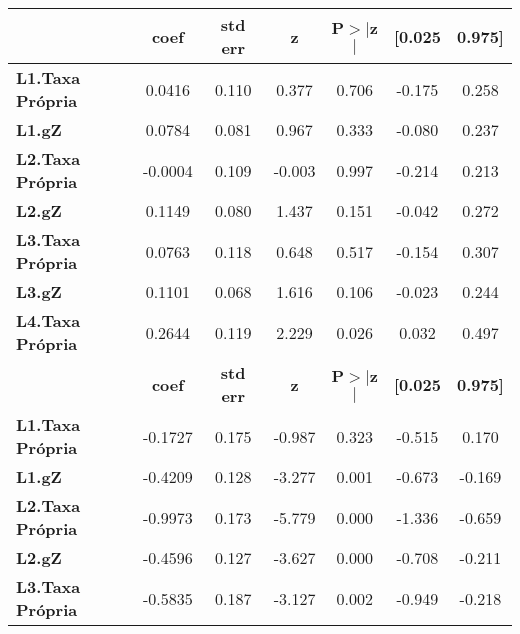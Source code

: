 \begin{center}
\begin{tabular}{lcccccc}
\toprule
                         & \textbf{coef} & \textbf{std err} & \textbf{z} & \textbf{P$> |$z$|$} & \textbf{[0.025} & \textbf{0.975]}  \\
\midrule
\textbf{L1.Taxa Própria} &       0.0416  &        0.110     &     0.377  &         0.706        &       -0.175    &        0.258     \\
\textbf{L1.gZ}           &       0.0784  &        0.081     &     0.967  &         0.333        &       -0.080    &        0.237     \\
\textbf{L2.Taxa Própria} &      -0.0004  &        0.109     &    -0.003  &         0.997        &       -0.214    &        0.213     \\
\textbf{L2.gZ}           &       0.1149  &        0.080     &     1.437  &         0.151        &       -0.042    &        0.272     \\
\textbf{L3.Taxa Própria} &       0.0763  &        0.118     &     0.648  &         0.517        &       -0.154    &        0.307     \\
\textbf{L3.gZ}           &       0.1101  &        0.068     &     1.616  &         0.106        &       -0.023    &        0.244     \\
\textbf{L4.Taxa Própria} &       0.2644  &        0.119     &     2.229  &         0.026        &        0.032    &        0.497     \\
                         & \textbf{coef} & \textbf{std err} & \textbf{z} & \textbf{P$> |$z$|$} & \textbf{[0.025} & \textbf{0.975]}  \\
\midrule
\textbf{L1.Taxa Própria} &      -0.1727  &        0.175     &    -0.987  &         0.323        &       -0.515    &        0.170     \\
\textbf{L1.gZ}           &      -0.4209  &        0.128     &    -3.277  &         0.001        &       -0.673    &       -0.169     \\
\textbf{L2.Taxa Própria} &      -0.9973  &        0.173     &    -5.779  &         0.000        &       -1.336    &       -0.659     \\
\textbf{L2.gZ}           &      -0.4596  &        0.127     &    -3.627  &         0.000        &       -0.708    &       -0.211     \\
\textbf{L3.Taxa Própria} &      -0.5835  &        0.187     &    -3.127  &         0.002        &       -0.949    &       -0.218     \\

\end{tabular}
\end{center}
